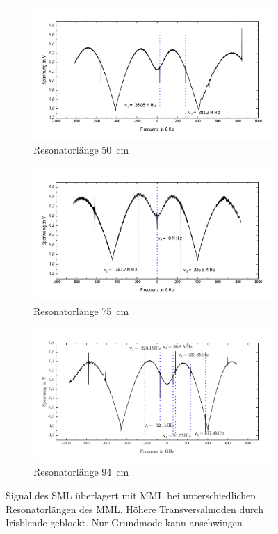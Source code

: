 \documentclass[a4paper,twoside,final]{article}
\begin{document}
\begin{figure}[htp]
  \centering
  \begin{subfigure}{0.8\textwidth}
    \includegraphics[width=\textwidth]{Bilder/mehrereResonatorlaengen_50cm_1Mode.pdf}
    \caption{Resonatorlänge \SI{50}{\centi\meter}}
  \end{subfigure}
  \begin{subfigure}{0.8\textwidth}
    \includegraphics[width=\textwidth]{Bilder/mehrereResonatorlaengen_75cm_1Mode.pdf}
    \caption{Resonatorlänge \SI{75}{\centi\meter}}
  \end{subfigure}
  \begin{subfigure}{0.8\textwidth}
    \includegraphics[width=\textwidth]{Bilder/1TransversaleMode_94cm.pdf}
    \caption{Resonatorlänge \SI{94}{\centi\meter}}
  \end{subfigure}
  \caption{Signal des SML überlagert mit MML bei unterschiedlichen Resonatorlängen des MML. Höhere Transversalmoden durch Irisblende geblockt. Nur Grundmode kann anschwingen}
  \label{fig:Resonatorveränderung}
\end{figure}
\end{document}
